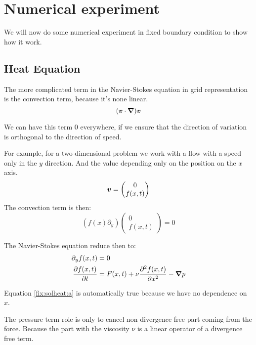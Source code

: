 \section{Numerical experiment}

We will now do some numerical experiment in fixed boundary condition to show how it work.

\subsection{Heat Equation}

The more complicated term in the Navier-Stokes equation in grid representation is the convection term, because it's none linear.
\begin{equation}
	({\boldsymbol {v}}\cdot {\boldsymbol {\nabla}}){\boldsymbol {v}}
\end{equation}

We can have this term 0 everywhere, if we ensure that the direction of variation is orthogonal to the direction of speed.

For example, for a two dimensional problem we work with a flow with a speed only in the $y$ direction. And the value depending only on the position on the $x$ axis.
\begin{equation}
	{\boldsymbol {v}}=\begin{pmatrix}
	         	0\\f(x,t)
	         \end{pmatrix}
\end{equation}
The convection term is then:
\begin{equation}
	(f(x)\partial_{y})\begin{pmatrix}
	         	0\\f(x,t)
	         \end{pmatrix}=0
\end{equation}

The Navier-Stokes equation reduce then to:
\begin{align}
\label{fix:solheat:a}
	\partial_{y}f(x,t)&=0\\
	\frac{\partial f(x,t)}{\partial t}&=F(x,t)+\nu\frac{\partial^2 f(x,t)}{\partial x^2}-{\boldsymbol {\nabla}}p
\end{align}

Equation \ref{fix:solheat:a} is automatically true because we have no dependence on $x$.

The pressure term role is only to cancel non divergence free part coming from the force. Because the part with the viscosity $\nu$ is a linear operator
of a divergence free term.

